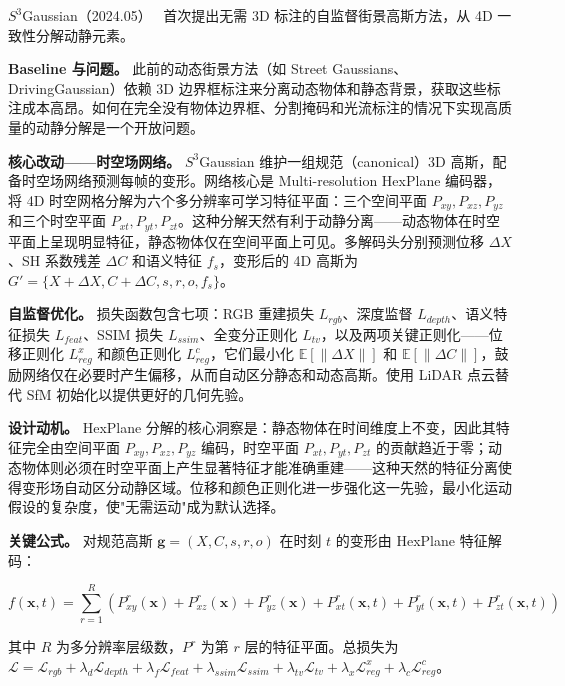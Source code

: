 $S^3$Gaussian（2024.05）~\cite{2405_20323} 首次提出无需 3D 标注的自监督街景高斯方法，从 4D 一致性分解动静元素。

\textbf{Baseline 与问题。} 此前的动态街景方法（如 Street Gaussians、DrivingGaussian）依赖 3D 边界框标注来分离动态物体和静态背景，获取这些标注成本高昂。如何在完全没有物体边界框、分割掩码和光流标注的情况下实现高质量的动静分解是一个开放问题。

\textbf{核心改动——时空场网络。} $S^3$Gaussian 维护一组规范（canonical）3D 高斯，配备时空场网络预测每帧的变形。网络核心是 Multi-resolution HexPlane 编码器，将 4D 时空网格分解为六个多分辨率可学习特征平面：三个空间平面 $P_{xy}, P_{xz}, P_{yz}$ 和三个时空平面 $P_{xt}, P_{yt}, P_{zt}$。这种分解天然有利于动静分离——动态物体在时空平面上呈现明显特征，静态物体仅在空间平面上可见。多解码头分别预测位移 $\Delta X$、SH 系数残差 $\Delta C$ 和语义特征 $f_s$，变形后的 4D 高斯为 $G' = \{X + \Delta X, C + \Delta C, s, r, o, f_s\}$。

\textbf{自监督优化。} 损失函数包含七项：RGB 重建损失 $L_{rgb}$、深度监督 $L_{depth}$、语义特征损失 $L_{feat}$、SSIM 损失 $L_{ssim}$、全变分正则化 $L_{tv}$，以及两项关键正则化——位移正则化 $L_{reg}^x$ 和颜色正则化 $L_{reg}^c$，它们最小化 $\mathbb{E}[\|\Delta X\|]$ 和 $\mathbb{E}[\|\Delta C\|]$，鼓励网络仅在必要时产生偏移，从而自动区分静态和动态高斯。使用 LiDAR 点云替代 SfM 初始化以提供更好的几何先验。

\textbf{设计动机。} HexPlane 分解的核心洞察是：静态物体在时间维度上不变，因此其特征完全由空间平面 $P_{xy}, P_{xz}, P_{yz}$ 编码，时空平面 $P_{xt}, P_{yt}, P_{zt}$ 的贡献趋近于零；动态物体则必须在时空平面上产生显著特征才能准确重建——这种天然的特征分离使得变形场自动区分动静区域。位移和颜色正则化进一步强化这一先验，最小化运动假设的复杂度，使"无需运动"成为默认选择。

\textbf{关键公式。} 对规范高斯 $\mathbf{g} = (X, C, s, r, o)$ 在时刻 $t$ 的变形由 HexPlane 特征解码：

\begin{equation*}
f(\mathbf{x}, t) = \sum_{r=1}^{R} \left( P_{xy}^r(\mathbf{x}) + P_{xz}^r(\mathbf{x}) + P_{yz}^r(\mathbf{x}) + P_{xt}^r(\mathbf{x}, t) + P_{yt}^r(\mathbf{x}, t) + P_{zt}^r(\mathbf{x}, t) \right)
\end{equation*}

其中 $R$ 为多分辨率层级数，$P^r$ 为第 $r$ 层的特征平面。总损失为 $\mathcal{L} = \mathcal{L}_{rgb} + \lambda_d \mathcal{L}_{depth} + \lambda_f \mathcal{L}_{feat} + \lambda_{ssim} \mathcal{L}_{ssim} + \lambda_{tv} \mathcal{L}_{tv} + \lambda_x \mathcal{L}_{reg}^x + \lambda_c \mathcal{L}_{reg}^c$。

